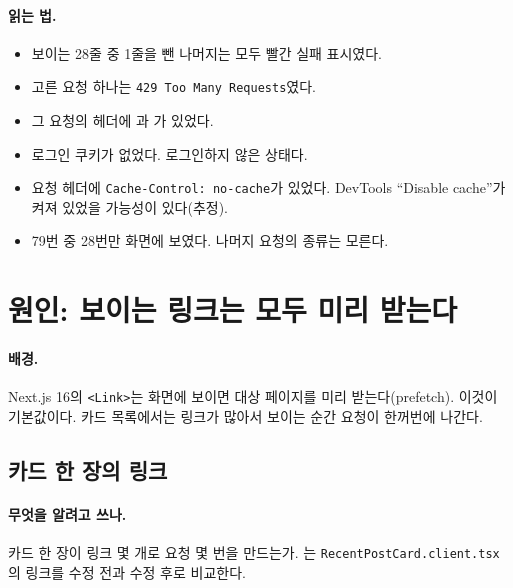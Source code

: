 \paragraph{읽는 법.}
\begin{itemize}[nosep]
  \item 보이는 28줄 중 1줄을 뺀 나머지는 모두 빨간 실패 표시였다.
  \item 고른 요청 하나는 \texttt{429 Too Many Requests}였다.
  \item 그 요청의 헤더에 과 가 있었다.
  \item 로그인 쿠키가 없었다. 로그인하지 않은 상태다.
  \item 요청 헤더에 \texttt{Cache-Control: no-cache}가 있었다. DevTools ``Disable cache''가 켜져 있었을 가능성이 있다(추정).
  \item 79번 중 28번만 화면에 보였다. 나머지 요청의 종류는 모른다.
\end{itemize}

\section{원인: 보이는 링크는 모두 미리 받는다}\label{sec:pf-cause}

\paragraph{배경.}
Next.js 16의 \texttt{<Link>}는 화면에 보이면 대상 페이지를 미리 받는다(prefetch).
이것이 기본값이다.
카드 목록에서는 링크가 많아서 보이는 순간 요청이 한꺼번에 나간다.

\subsection{카드 한 장의 링크}\label{sec:pf-links}

\paragraph{무엇을 알려고 쓰나.}
카드 한 장이 링크 몇 개로 요청 몇 번을 만드는가.
는 \texttt{RecentPostCard.client.tsx}의 링크를 수정 전과 수정 후로 비교한다.


